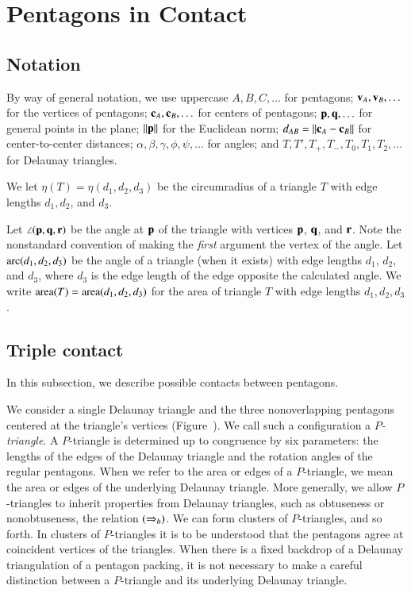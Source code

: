\section{Pentagons in Contact}

\subsection{Notation}

By way of general notation, we use uppercase $A,B,C,\ldots$ for
pentagons; ${\mathbf v}_A,{\mathbf v}_B,\ldots$ for the vertices of pentagons;
${\mathbf c}_A,{\mathbf c}_B,\ldots$ for centers of pentagons; ${\mathbf p},{\mathbf q},\ldots$ for
general points in the plane; ${\|{\mathbf p}\|}$ for the Euclidean norm;
$\dx{AB}=\dd{A}{B}$ for center-to-center distances;
$\alpha,\beta,\gamma,\phi,\psi,\ldots$ for angles; and
$T,T',T_+,T_-,T_0,T_1,T_2,\ldots$ for Delaunay triangles.

We let $\eta(T) = \eta(d_1,d_2,d_3)$ be the circumradius of a triangle
$T$ with edge lengths $d_1,d_2$, and $d_3$.

Let $\angle({\mathbf p},{\mathbf q},{\mathbf r})$ be the angle at ${\mathbf p}$ of the triangle with
vertices ${\mathbf p}$, ${\mathbf q}$, and ${\mathbf r}$.  Note the nonstandard convention of
making the \emph{first} argument the vertex of the angle.  Let $\operatorname{arc}(d_1,d_2,d_3)$ be the angle
of a triangle (when it exists) with edge lengths $d_1$, $d_2$, and
$d_3$, where $d_3$ is the edge length of the edge opposite the
calculated angle.  We write ${\operatorname{area}}(T)= {\operatorname{area}}(d_1,d_2,d_3)$ for the
area of triangle $T$ with edge lengths $d_1,d_2,d_3$.

\subsection{Triple contact}

In this subsection, we describe possible contacts between pentagons.

We consider a single Delaunay triangle and the three nonoverlapping
pentagons centered at the triangle's vertices
(Figure~).  We call such a configuration a {\it
  $P$-triangle}.  A $P$-triangle is determined up to congruence by six
parameters: the lengths of the edges of the Delaunay triangle and the
rotation angles of the regular pentagons.  When we refer to the area
or edges of a $P$-triangle, we mean the area or edges of the
underlying Delaunay triangle.  More generally, we allow $P$-triangles
to inherit properties from Delaunay triangles, such as obtuseness or
nonobtuseness, the relation $(\Rightarrow_{b})$. We can form clusters of $P$-triangles, and so forth. In
clusters of $P$-triangles it is to be understood that the pentagons
agree at coincident vertices of the triangles.  When there is a
fixed backdrop of a Delaunay triangulation of a pentagon packing, it
is not necessary to make a careful distinction between a $P$-triangle
and its underlying Delaunay triangle.


